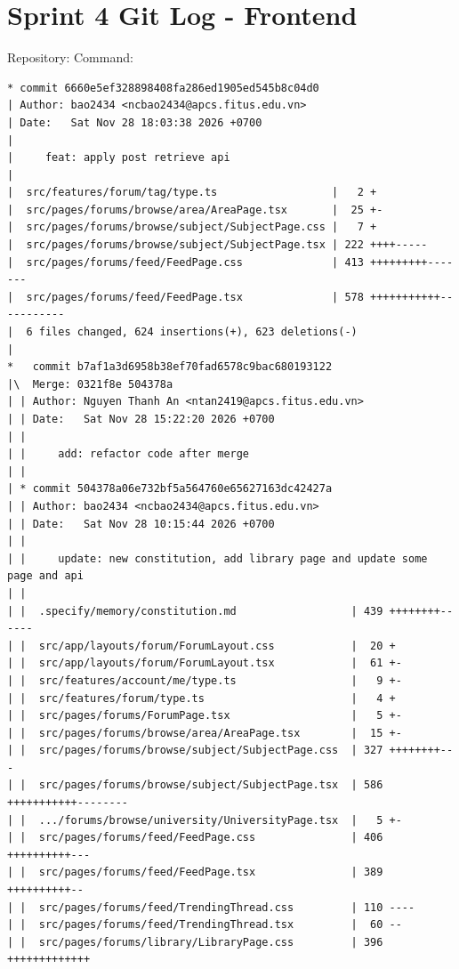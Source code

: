 \documentclass[12pt]{article}
\begin{document}

\section{Sprint 4 Git Log - Frontend}

Repository: \texttt{} Command: \texttt{}

\begin{lstlisting}[numbers=none,breaklines=true]
* commit 6660e5ef328898408fa286ed1905ed545b8c04d0
| Author: bao2434 <ncbao2434@apcs.fitus.edu.vn>
| Date:   Sat Nov 28 18:03:38 2026 +0700
|
|     feat: apply post retrieve api
|
|  src/features/forum/tag/type.ts                  |   2 +
|  src/pages/forums/browse/area/AreaPage.tsx       |  25 +-
|  src/pages/forums/browse/subject/SubjectPage.css |   7 +
|  src/pages/forums/browse/subject/SubjectPage.tsx | 222 ++++-----
|  src/pages/forums/feed/FeedPage.css              | 413 +++++++++-------
|  src/pages/forums/feed/FeedPage.tsx              | 578 +++++++++++-----------
|  6 files changed, 624 insertions(+), 623 deletions(-)
|
*   commit b7af1a3d6958b38ef70fad6578c9bac680193122
|\  Merge: 0321f8e 504378a
| | Author: Nguyen Thanh An <ntan2419@apcs.fitus.edu.vn>
| | Date:   Sat Nov 28 15:22:20 2026 +0700
| |
| |     add: refactor code after merge
| |
| * commit 504378a06e732bf5a564760e65627163dc42427a
| | Author: bao2434 <ncbao2434@apcs.fitus.edu.vn>
| | Date:   Sat Nov 28 10:15:44 2026 +0700
| |
| |     update: new constitution, add library page and update some page and api
| |
| |  .specify/memory/constitution.md                  | 439 ++++++++------
| |  src/app/layouts/forum/ForumLayout.css            |  20 +
| |  src/app/layouts/forum/ForumLayout.tsx            |  61 +-
| |  src/features/account/me/type.ts                  |   9 +-
| |  src/features/forum/type.ts                       |   4 +
| |  src/pages/forums/ForumPage.tsx                   |   5 +-
| |  src/pages/forums/browse/area/AreaPage.tsx        |  15 +-
| |  src/pages/forums/browse/subject/SubjectPage.css  | 327 ++++++++---
| |  src/pages/forums/browse/subject/SubjectPage.tsx  | 586 +++++++++++--------
| |  .../forums/browse/university/UniversityPage.tsx  |   5 +-
| |  src/pages/forums/feed/FeedPage.css               | 406 ++++++++++---
| |  src/pages/forums/feed/FeedPage.tsx               | 389 ++++++++++--
| |  src/pages/forums/feed/TrendingThread.css         | 110 ----
| |  src/pages/forums/feed/TrendingThread.tsx         |  60 --
| |  src/pages/forums/library/LibraryPage.css         | 396 +++++++++++++

\end{lstlisting}
\end{document}
